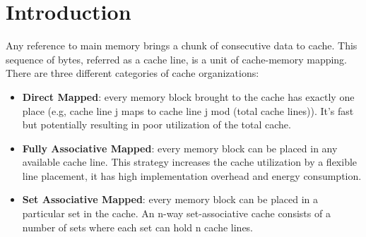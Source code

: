 \section{Introduction}
\label{introduction}

Any reference to main memory brings a chunk of consecutive data to cache. This sequence of bytes, referred as a cache line, is a unit of cache-memory mapping. There are three different categories of cache organizations: 

\begin{itemize}
	\item \textbf{Direct Mapped}: every memory block brought to the cache has exactly one place (e.g, cache line j maps to cache line j mod (total cache lines)). It's fast but potentially resulting in poor utilization of the total cache.
	
	\item \textbf{Fully Associative Mapped}: every memory block can be placed in any available cache line. This strategy increases the cache utilization by a flexible line placement, it has high implementation overhead and energy consumption.

	\item \textbf{Set Associative Mapped}: every memory block can be placed in a particular set in the cache. An n-way set-associative cache consists of a number of sets where each set can hold n cache lines.
\end{itemize}

